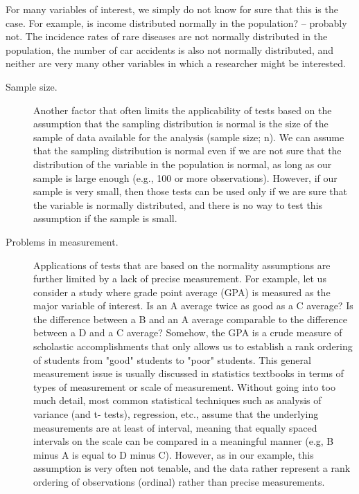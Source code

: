 For many variables of interest, we simply do not know for sure that this is the case. 
For example, is income distributed normally in the population? -- probably not. The incidence rates of rare diseases 
are not normally distributed in the population, the number of car accidents is also not normally distributed, and 
neither are very many other variables in which a researcher might be interested.


\begin{description}
\item[Sample size.] Another factor that often limits the applicability of tests based on the assumption that the sampling distribution is normal is the size of the sample of data available for the analysis (sample size; n). We can assume that the sampling distribution is normal even if we are not sure that the distribution of the variable in the population is normal, as long as our sample is large enough (e.g., 100 or more observations). However, if our sample is very small, then those tests can be used only if we are sure that the variable is normally distributed, and there is no way to test this assumption if the sample is small.

\item[Problems in measurement.] Applications of tests that are based on the normality assumptions are further limited by a lack of precise measurement. For example, let us consider a study where grade point average (GPA) is measured as the major variable of interest. Is an A average twice as good as a C average? Is the difference between a B and an A average comparable to the difference between a D and a C average? Somehow, the GPA is a crude measure of scholastic accomplishments that only allows us to establish a rank ordering of students from "good" students to "poor" students. This general measurement issue is usually discussed in statistics textbooks in terms of types of measurement or scale of measurement. Without going into too much detail, most common statistical techniques such as analysis of variance (and t- tests), regression, etc., assume that the underlying measurements are at least of interval, meaning that equally spaced intervals on the scale can be compared in a meaningful manner (e.g, B minus A is equal to D minus C). However, as in our example, this assumption is very often not tenable, and the data rather represent a rank ordering of observations (ordinal) rather than precise measurements.
\end{description}
